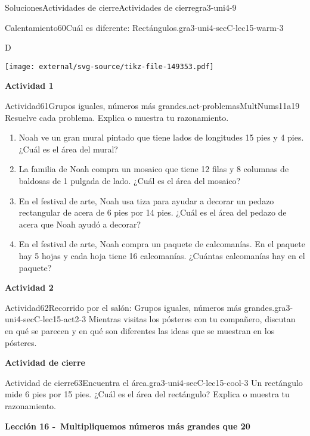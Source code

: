 \documentclass[twoside,10pt,]{article}
\begin{document}
\begin{solutions-section}{Soluciones}{Actividades de cierre}{}{Actividades de cierre}{}{}{gra3-uni4-9}
\begin{explorationsolution}{Calentamiento}{60}{Cuál es diferente: Rectángulos.}{gra3-uni4-secC-lec15-warm-3}
\begin{sidebyside}{2}{0}{0}{0}
\begin{sbspanel}{0.5}
D%
\par
\texttt{[image: external/svg-source/tikz-file-149353.pdf]}
\end{sbspanel}%
\end{sidebyside}%
\end{explorationsolution}%
\par\medskip
\noindent\textbf{\large{}\space\textperiodcentered\space{}Actividad 1}
\begin{activitysolution}{Actividad}{61}{Grupos iguales, números más grandes.}{act-problemasMultNums11a19}%
Resuelve cada problema. Explica o muestra tu razonamiento.%
%
\begin{enumerate}
\item{}Noah ve un gran mural pintado que tiene lados de longitudes 15 pies y 4 pies. ¿Cuál es el área del mural?%
\item{}La familia de Noah compra un mosaico que tiene 12 filas y 8 columnas de baldosas de 1 pulgada de lado. ¿Cuál es el área del mosaico?%
\item{}En el festival de arte, Noah usa tiza para ayudar a decorar un pedazo rectangular de acera de 6 pies por 14 pies. ¿Cuál es el área del pedazo de acera que Noah ayudó a decorar?%
\item{}En el festival de arte, Noah compra un paquete de calcomanías. En el paquete hay 5 hojas y cada hoja tiene 16 calcomanías. ¿Cuántas calcomanías hay en el paquete?%
\end{enumerate}
\end{activitysolution}%
\par\medskip
\noindent\textbf{\large{}\space\textperiodcentered\space{}Actividad 2}
\begin{activitysolution}{Actividad}{62}{Recorrido por el salón: Grupos iguales, números más grandes.}{gra3-uni4-secC-lec15-act2-3}%
Mientras visitas los pósteres con tu compañero, discutan en qué se parecen y en qué son diferentes las ideas que se muestran en los pósteres.%
\end{activitysolution}%
\par\medskip
\noindent\textbf{\large{}\space\textperiodcentered\space{}Actividad de cierre}
\begin{projectsolution}{Actividad de cierre}{63}{Encuentra el área.}{gra3-uni4-secC-lec15-cool-3}%
Un rectángulo mide 6 pies por 15 pies. ¿Cuál es el área del rectángulo? Explica o muestra tu razonamiento.%
\end{projectsolution}%
\par\medskip
\noindent\textbf{\large{}\space\textperiodcentered\space{}Lección 16 -~Multipliquemos números más grandes que 20\\
}
\end{solutions-section}
\end{document}
